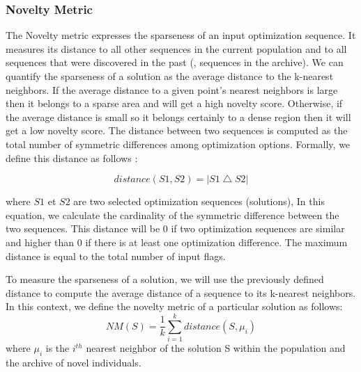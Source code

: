 \subsubsection{Novelty Metric}
The Novelty metric expresses the sparseness of an input optimization sequence. It measures its distance to all other sequences in the current population and to all sequences that were discovered in the past (\ie, sequences in the archive). 
We can quantify the sparseness of a solution as the average distance to the k-nearest neighbors. 
If the average distance to a given point's nearest neighbors is large then it belongs to a sparse area and will get a high novelty score. 
Otherwise, if the average distance is small so it belongs certainly to a dense region then it will get a low novelty score. 
The distance between two sequences is computed as the total number of symmetric differences among optimization options. Formally, we define this distance as follows :

\begin{equation}
distance(S1,S2)=\left | S1 \bigtriangleup S2 \right |
\end{equation}

where $S1$ et $S2$ are two selected optimization sequences (solutions), In this equation, we calculate the cardinality of the symmetric difference between the two sequences. This distance will be 0 if two optimization sequences are similar and higher than 0 if there is at least one optimization difference. The maximum distance is equal to the total number of input flags.

To measure the sparseness of a solution, we will use the previously defined distance to compute the average distance of a sequence to its k-nearest neighbors. In this context, we define the novelty metric of a particular solution as follows:
\begin{equation}
NM(S) = \frac{1}{k} \sum_{i=1}^{k} distance(S,\mu _{i})
\end{equation}
where $\mu _{i}$ is the $i^{th}$ nearest neighbor of the solution S within the population and the archive of novel individuals.